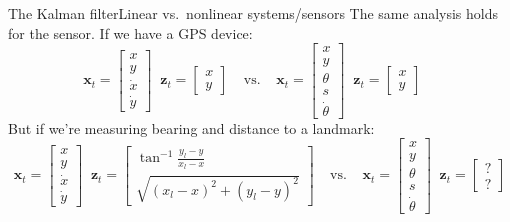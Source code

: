 \documentclass[aspectratio=169]{beamer}
\renewcommand{\vec}[1]{\boldsymbol{#1}}
\begin{document}
\begin{frame}{The Kalman filter}{Linear vs.\ nonlinear systems/sensors}
The same analysis holds for the sensor. If we have a GPS device:
$$ \vec{x}_t = \begin{bmatrix} x \\ y \\ \dot{x} \\ \dot{y} \end{bmatrix} \; \;
   \vec{z}_t = \begin{bmatrix} x \\ y \end{bmatrix} \; \; \; \; \text{vs.}
   \; \; \; \;
   \vec{x}_t = \begin{bmatrix} x \\ y \\ \theta \\ s \\ \dot{\theta}
               \end{bmatrix} \; \;
   \vec{z}_t = \begin{bmatrix} x \\ y \end{bmatrix} \; \; \; \;
$$
But if we're measuring bearing and distance to a landmark:
$$ \vec{x}_t = \begin{bmatrix} x \\ y \\ \dot{x} \\ \dot{y} \end{bmatrix} \; \;
   \vec{z}_t = \begin{bmatrix} \tan^{-1} \frac{y_l - y}{x_l - x} \\
                    \sqrt{(x_l-x)^2+(y_l-y)^2} \end{bmatrix} \; \; \; \;
   \text{vs.} \; \; \; \;
   \vec{x}_t = \begin{bmatrix} x \\ y \\ \theta \\ s \\ \dot{\theta}
               \end{bmatrix} \; \;
   \vec{z}_t = \begin{bmatrix} ? \\ ? \end{bmatrix}
$$


\end{frame}

\end{document}
